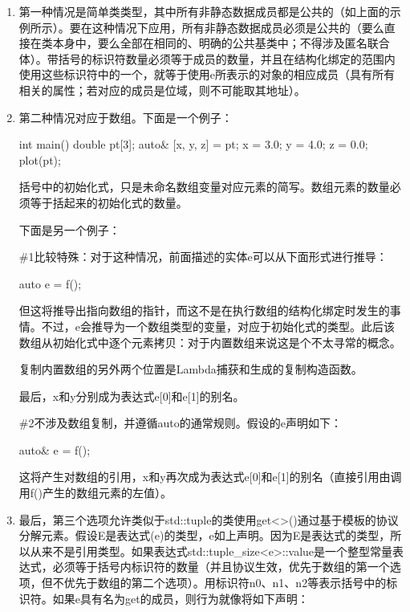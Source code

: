 \begin{enumerate}
\item
第一种情况是简单类类型，其中所有非静态数据成员都是公共的（如上面的示例所示）。要在这种情况下应用，所有非静态数据成员必须是公共的（要么直接在类本身中，要么全部在相同的、明确的公共基类中；不得涉及匿名联合体）。带括号的标识符数量必须等于成员的数量，并且在结构化绑定的范围内使用这些标识符中的一个，就等于使用e所表示的对象的相应成员（具有所有相关的属性；若对应的成员是位域，则不可能取其地址）。

\item
第二种情况对应于数组。下面是一个例子：

\begin{cpp}
int main() {
	double pt[3];
	auto& [x, y, z] = pt;
	x = 3.0; y = 4.0; z = 0.0;
	plot(pt);
}
\end{cpp}

括号中的初始化式，只是未命名数组变量对应元素的简写。数组元素的数量必须等于括起来的初始化式的数量。

下面是另一个例子：


\#1比较特殊：对于这种情况，前面描述的实体e可以从下面形式进行推导：

\begin{cpp}
auto e = f();
\end{cpp}

但这将推导出指向数组的指针，而这不是在执行数组的结构化绑定时发生的事情。不过，e会推导为一个数组类型的变量，对应于初始化式的类型。此后该数组从初始化式中逐个元素拷贝：对于内置数组来说这是个不太寻常的概念。

\begin{notice}
复制内置数组的另外两个位置是Lambda捕获和生成的复制构造函数。
\end{notice}

最后，x和y分别成为表达式e[0]和e[1]的别名。

\#2不涉及数组复制，并遵循auto的通常规则。假设的e声明如下：

\begin{cpp}
auto& e = f();
\end{cpp}

这将产生对数组的引用，x和y再次成为表达式e[0]和e[1]的别名（直接引用由调用f()产生的数组元素的左值）。

\item
最后，第三个选项允许类似于std::tuple的类使用get<>()通过基于模板的协议分解元素。假设E是表达式(e)的类型，e如上声明。因为E是表达式的类型，所以从来不是引用类型。如果表达式std::tuple\_size<e>::value是一个整型常量表达式，必须等于括号内标识符的数量（并且协议生效，优先于数组的第一个选项，但不优先于数组的第二个选项）。用标识符n0、n1、n2等表示括号中的标识符。如果e具有名为get的成员，则行为就像将如下声明：


\end{enumerate}
